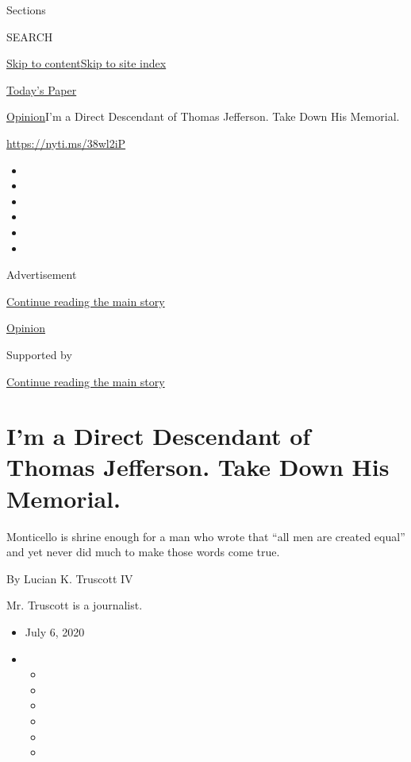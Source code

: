 Sections

SEARCH

\protect\hyperlink{site-content}{Skip to
content}\protect\hyperlink{site-index}{Skip to site index}

\href{https://myaccount.nytimes3xbfgragh.onion/auth/login?response_type=cookie\&client_id=vi}{}

\href{https://www.nytimes3xbfgragh.onion/section/todayspaper}{Today's
Paper}

\href{/section/opinion}{Opinion}\textbar{}I'm a Direct Descendant of
Thomas Jefferson. Take Down His Memorial.

\url{https://nyti.ms/38wl2iP}

\begin{itemize}
\item
\item
\item
\item
\item
\item
\end{itemize}

Advertisement

\protect\hyperlink{after-top}{Continue reading the main story}

\href{/section/opinion}{Opinion}

Supported by

\protect\hyperlink{after-sponsor}{Continue reading the main story}

\hypertarget{im-a-direct-descendant-of-thomas-jefferson-take-down-his-memorial}{%
\section{I'm a Direct Descendant of Thomas Jefferson. Take Down His
Memorial.}\label{im-a-direct-descendant-of-thomas-jefferson-take-down-his-memorial}}

Monticello is shrine enough for a man who wrote that ``all men are
created equal'' and yet never did much to make those words come true.

By Lucian K. Truscott IV

Mr. Truscott is a journalist.

\begin{itemize}
\item
  July 6, 2020
\item
  \begin{itemize}
  \item
  \item
  \item
  \item
  \item
  \item
  \end{itemize}
\end{itemize}

